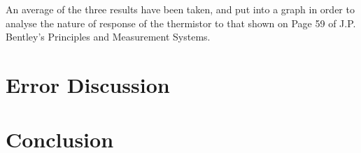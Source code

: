 \documentclass[a4,11pt]{article}
\begin{document}
An average of the three results have been taken, and put into a graph in order to analyse the nature of response of the thermistor to that shown on Page 59 of J.P. Bentley's Principles and Measurement Systems.
\section{Error Discussion}
\label{sec:error}
\section{Conclusion}
\end{document}
